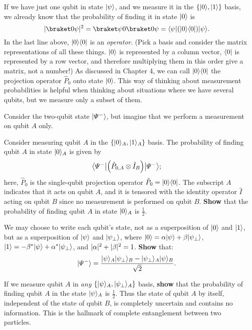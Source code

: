 \documentclass{../phys084}
\begin{document}
\begin{exercise}
  If we have just one qubit in state \(\ket \psi\), and we measure it
  in the \(\set{\ket 0, \ket 1}\) basis, we already know that the
  probability of finding it in state \(\ket 0\) is
  \[
    \abs{\braket 0 \psi}^2
    = \braket \psi 0\braket 0 \psi
    = \bra \psi (\ket 0 \bra 0) \ket \psi.
  \]
  In the last line above, \(\ket 0 \bra 0\) is an \textit{operator}.
  (Pick a basis and consider the matrix representations of all these
  things.  \(\ket 0\) is represented by a column vector, \(\bra 0\) is
  represented by a row vector, and therefore multiplying them in this
  order give a matrix, not a number!)  As discussed in Chapter 4, we
  can call \(\ket 0 \bra 0\) the projection operator \(\hat P_0\) onto
  state \(\ket 0\).  This way of thinking about measurement
  probabilities is helpful when thinking about situations where we
  have several qubits, but we measure only a subset of them.

  Consider the two-qubit state \(\ket{\Psi^-}\), but imagine that we
  perform a measurement on qubit \(A\) only.

  \begin{problems}
  \item Consider measuring qubit \(A\) in the
    \(\set{\ket 0_A, \ket 1_A}\) basis.  The probability of finding
    qubit \(A\) in state \(\ket 0_A\) is given by
    \[
      \bra*{\Psi^-} \prn*{\hat P_{0,A} \otimes \hat I_B} \ket*{\Psi^-};
    \]
    here, \(\hat P_ 0\) is the single-qubit projection operator
    \(\hat P_ 0 = \ket 0 \bra 0\).  The subscript \(A\) indicates that
    it acts on qubit \(A\), and it is tensored with the identity
    operator \(\hat I\) acting on qubit \(B\) since no measurement is
    performed on qubit \(B\).  \textbf{Show} that the probability of
    finding qubit \(A\) in state \(\ket 0_A\) is \(\frac 1 2\).

  \item We may choose to write each qubit's state, not as a
    superposition of \(\ket 0\) and \(\ket 1\), but as a superposition
    of \(\ket \psi\) and \(\ket{\psi_\perp}\), where
    \(\ket 0 = \alpha \ket \psi + \beta \ket{\psi_\perp}\),
    \(\ket 1 = -\beta^* \ket \psi + \alpha^* \ket{\psi_\perp}\), and
    \(\abs \alpha^2 + \abs \beta^2 = 1\).  \textbf{Show} that:
    \[
      \ket{\Psi^-} = \frac
      {\ket \psi_A\ket{\psi_\perp}_B - \ket{\psi_\perp}_A\ket \psi_B}
      {\sqrt 2}.
    \]

  \item If we measure qubit \(A\) in \textit{any}
    \(\set*{\ket \psi_A, \ket{\psi_\perp}_A}\) basis, \textbf{show}
    that the probability of finding qubit \(A\) in the state
    \(\ket \psi_A\) is \(\frac 1 2\).  Thus the state of qubit \(A\)
    by itself, independent of the state of qubit \(B\), is completely
    uncertain and contains no information.  This is the hallmark of
    complete entanglement between two particles.
  \end{problems}
\end{exercise}
\end{document}
